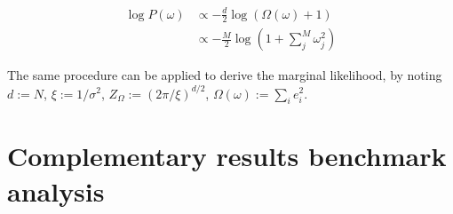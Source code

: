 \documentclass[11pt, oneside]{article}
\begin{document}
\vspace{-0.5cm}
\begin{equation}
\begin{aligned}
    \log P(\omega) &\propto - \frac{d}{2} \log \left(\Omega(\omega)+1\right) \\
    &\propto -\frac{M}{2} \log \left(1 + \sum_j^M \omega_j^2 \right)
\end{aligned}
\end{equation}

The same procedure can be applied to derive the marginal likelihood, by noting $d := N$, $\xi := 1/\sigma^2$, $Z_\Omega := (2\pi/\xi)^{d/2}$, $\Omega(\omega) := \sum_i e_i^2$.

\newpage
\section{Complementary results benchmark analysis}
\end{document}
